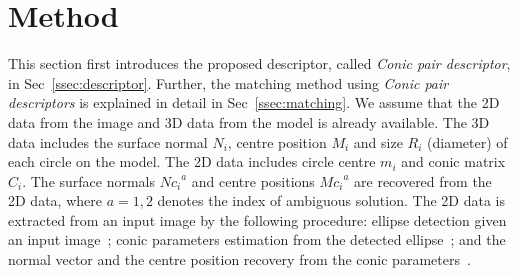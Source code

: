 \documentclass{bmvc2k}
\newcommand{\sref}[1]{Sec\bmvaOneDot~\ref{#1}}
\newcommand{\hemal}[2]{\textcolor{red}{\sout{#1}} \textcolor{green}{#2}}
\def\etal{\emph{et al}\bmvaOneDot}
\begin{document}

\section{Method}
This section first introduces the proposed descriptor, called {\textit{Conic pair descriptor}}, in \sref{ssec:descriptor}.  Further, the matching method using \textit{Conic pair descriptors} is explained in detail in \sref{ssec:matching}.
We assume that the 2D data from the image and 3D data from the model is already available.
The 3D data includes the surface normal $N_i$, centre position $M_i$ and size $R_i$ (diameter) of each circle on the model. 
The 2D data includes circle centre $ m_i $ and conic matrix $ C_i $.
The surface normals ${Nc_i}^a$ and centre positions ${Mc_i}^a$ are recovered from the 2D data, where $a ={1,2}$ denotes the index of ambiguous solution. 
The 2D data is extracted from an input image by the following procedure:
ellipse detection given an input image~\cite{naimark_circular_2002};
conic parameters estimation from the detected ellipse~\cite{farin_geometry_1998}; and
the normal vector and the centre position recovery from the conic parameters~\cite{lo_pez_de_ipin_a_trip:_2002}.
\end{document}
